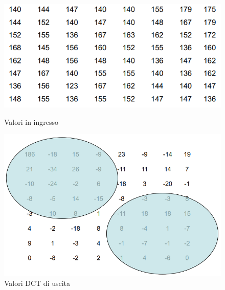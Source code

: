 \documentclass[a4paper,11pt]{article} %
\begin{document}
\begin{figure}[h]
\centering
\begin{minipage}[b]{0.5\textwidth}
\centering
    \includegraphics[width=\linewidth]{DCT example 1.png}
    \caption{Valori in ingresso}
\end{minipage}%
\begin{minipage}[b]{0.5\textwidth}
\centering
    \includegraphics[width=\linewidth]{DCT example 2.png}
    \caption{Valori DCT di uscita}
\end{minipage}
\end{figure}
\end{document}
